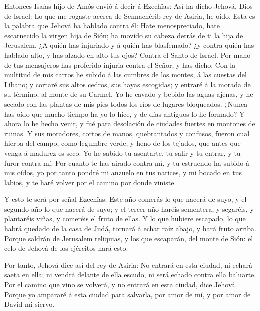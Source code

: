  Entonces Isaías hijo de Amós envió á decir á Ezechîas: Así
ha dicho Jehová, Dios de Israel: Lo que me rogaste acerca de Sennachêrib
rey de Asiria, he oído.  Esta es la palabra que Jehová ha
hablado contra él: Hate menospreciado, hate escarnecido la virgen hija
de Sión; ha movido su cabeza detrás de ti la hija de Jerusalem.
 ¿A quién has injuriado y á quién has blasfemado? ¿y contra
quién has hablado alto, y has alzado en alto tus ojos? Contra el Santo
de Israel.  Por mano de tus mensajeros has proferido
injuria contra el Señor, y has dicho: Con la multitud de mis carros he
subido á las cumbres de los montes, á las cuestas del Líbano; y cortaré
sus altos cedros, sus hayas escogidas; y entraré á la morada de su
término, al monte de su Carmel.  Yo he cavado y bebido las
aguas ajenas, y he secado con las plantas de mis pies todos los ríos de
lugares bloqueados.  ¿Nunca has oído que mucho tiempo ha yo
lo hice, y de días antiguos lo he formado? Y ahora lo he hecho venir, y
fué para desolación de ciudades fuertes en montones de ruinas.
 Y sus moradores, cortos de manos, quebrantados y confusos,
fueron cual hierba del campo, como legumbre verde, y heno de los
tejados, que antes que venga á madurez es seco.  Yo he
sabido tu asentarte, tu salir y tu entrar, y tu furor contra mí.
 Por cuanto te has airado contra mí, y tu estruendo ha
subido á mis oídos, yo por tanto pondré mi anzuelo en tus narices, y mi
bocado en tus labios, y te haré volver por el camino por donde viniste.

 Y esto te será por señal Ezechîas: Este año comerás lo que
nacerá de suyo, y el segundo año lo que nacerá de suyo; y el tercer año
haréis sementera, y segaréis, y plantaréis viñas, y comeréis el fruto de
ellas.  Y lo que hubiere escapado, lo que habrá quedado de
la casa de Judá, tornará á echar raíz abajo, y hará fruto arriba.
 Porque saldrán de Jerusalem reliquias, y los que
escaparán, del monte de Sión: el celo de Jehová de los ejércitos hará
esto.

 Por tanto, Jehová dice así del rey de Asiria: No entrará
en esta ciudad, ni echará saeta en ella; ni vendrá delante de ella
escudo, ni será echado contra ella baluarte.  Por el camino
que vino se volverá, y no entrará en esta ciudad, dice Jehová.
 Porque yo ampararé á esta ciudad para salvarla, por amor
de mí, y por amor de David mi siervo.

